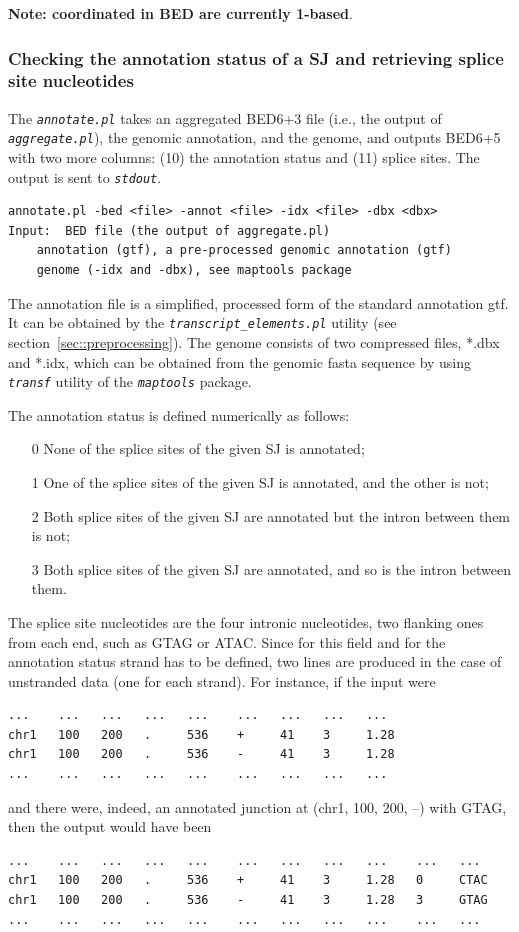 \documentclass{article}
\newcommand{\prog}[1]{{\tt\em #1}}
\begin{document}
{\bf Note: coordinated in BED are currently 1-based}.


\subsubsection[Annotation status and splice site nucleotides]{Checking the annotation status of a SJ and retrieving splice site nucleotides}
\label{sec::annotation_status}
The \prog{annotate.pl} takes an aggregated BED6+3 file (i.e., the output of \prog{aggregate.pl}), the genomic annotation, and the genome, and outputs BED6+5 
with two more columns: (10) the annotation status and (11) splice sites. The output is sent to \prog{stdout}.
\begin{verbatim}
annotate.pl -bed <file> -annot <file> -idx <file> -dbx <dbx>
Input:  BED file (the output of aggregate.pl)
	annotation (gtf), a pre-processed genomic annotation (gtf)
	genome (-idx and -dbx), see maptools package
\end{verbatim}
The annotation file is a simplified, processed form of the standard annotation gtf. It can be obtained by the \prog{transcript\_elements.pl} utility (see section~\ref{sec::preprocessing}).
The genome consists of two compressed files, *.dbx and *.idx, which can be obtained from the genomic fasta sequence by using \prog{transf} utility of the \prog{maptools} package. 

The annotation status is defined numerically as follows:
\begin{enumerate}
\item[0] None of the splice sites of the given SJ is annotated;
\item[1] One of the splice sites of the given SJ is annotated, and the other is not;
\item[2] Both splice sites of the given SJ are annotated but the intron between them is not;
\item[3] Both splice sites of the given SJ are annotated, and so is the intron between them.
\end{enumerate}

The splice site nucleotides are the four intronic nucleotides, two flanking ones from each end, such as GTAG or ATAC. Since for this field and for the annotation status strand 
has to be defined, two lines are produced in the case of unstranded data (one for each strand). For instance, if the input were
\begin{verbatim}
...    ...   ...   ...   ...    ...   ...   ...   ...
chr1   100   200   .     536    +     41    3     1.28
chr1   100   200   .     536    -     41    3     1.28
...    ...   ...   ...   ...    ...   ...   ...   ...
\end{verbatim}
and there were, indeed, an annotated junction at (chr1, 100, 200, --) with GTAG, then the output would have been
\begin{verbatim}
...    ...   ...   ...   ...    ...   ...   ...   ...    ...   ...
chr1   100   200   .     536    +     41    3     1.28   0     CTAC
chr1   100   200   .     536    -     41    3     1.28   3     GTAG
...    ...   ...   ...   ...    ...   ...   ...   ...    ...   ...
\end{verbatim}
\end{document}
